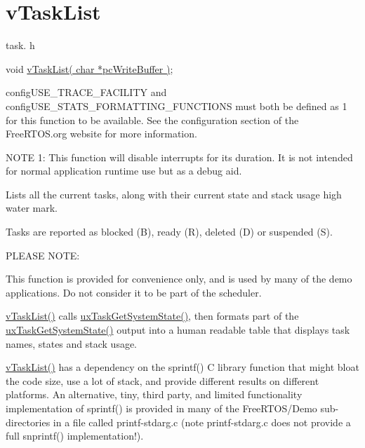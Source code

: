 \hypertarget{group__v_task_list}{}\section{v\+Task\+List}
\label{group__v_task_list}
task. h 
\begin{DoxyPre}void \hyperlink{externals_2freertos_2include_2task_8h_ab87abc717f34ddced76802d12588a93d}{vTaskList( char *pcWriteBuffer )};\end{DoxyPre}


config\+U\+S\+E\+\_\+\+T\+R\+A\+C\+E\+\_\+\+F\+A\+C\+I\+L\+I\+TY and config\+U\+S\+E\+\_\+\+S\+T\+A\+T\+S\+\_\+\+F\+O\+R\+M\+A\+T\+T\+I\+N\+G\+\_\+\+F\+U\+N\+C\+T\+I\+O\+NS must both be defined as 1 for this function to be available. See the configuration section of the Free\+R\+T\+O\+S.\+org website for more information.

N\+O\+TE 1\+: This function will disable interrupts for its duration. It is not intended for normal application runtime use but as a debug aid.

Lists all the current tasks, along with their current state and stack usage high water mark.

Tasks are reported as blocked (\textquotesingle{}B\textquotesingle{}), ready (\textquotesingle{}R\textquotesingle{}), deleted (\textquotesingle{}D\textquotesingle{}) or suspended (\textquotesingle{}S\textquotesingle{}).

P\+L\+E\+A\+SE N\+O\+TE\+:

This function is provided for convenience only, and is used by many of the demo applications. Do not consider it to be part of the scheduler.

\hyperlink{externals_2freertos_2include_2task_8h_ab87abc717f34ddced76802d12588a93d}{v\+Task\+List()} calls \hyperlink{externals_2freertos_2include_2task_8h_aa4603f3de3d809e9beb18d10fbac005d}{ux\+Task\+Get\+System\+State()}, then formats part of the \hyperlink{externals_2freertos_2include_2task_8h_aa4603f3de3d809e9beb18d10fbac005d}{ux\+Task\+Get\+System\+State()} output into a human readable table that displays task names, states and stack usage.

\hyperlink{externals_2freertos_2include_2task_8h_ab87abc717f34ddced76802d12588a93d}{v\+Task\+List()} has a dependency on the sprintf() C library function that might bloat the code size, use a lot of stack, and provide different results on different platforms. An alternative, tiny, third party, and limited functionality implementation of sprintf() is provided in many of the Free\+R\+T\+O\+S/\+Demo sub-\/directories in a file called printf-\/stdarg.\+c (note printf-\/stdarg.\+c does not provide a full snprintf() implementation!).

